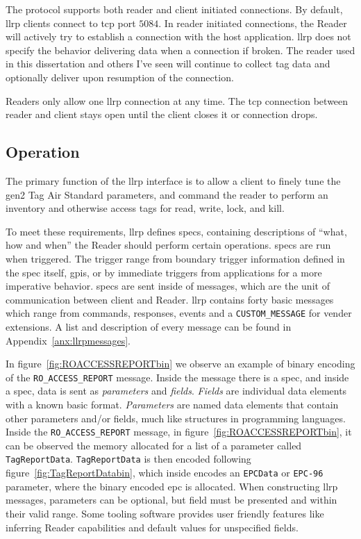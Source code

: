 The protocol supports both reader and client initiated connections. By default, \ac{llrp} clients connect to \acs{tcp} port $5084$. In reader initiated connections, the Reader will actively try to establish a connection with the host application.
\ac{llrp} does not specify the behavior delivering data when a connection if broken. The reader used in this dissertation and others I've seen will continue to collect tag data and optionally deliver upon resumption of the connection.

Readers only allow one \ac{llrp} connection at any time. The \ac{tcp} connection between reader and client stays open until the client closes it or connection drops.

\subsection{Operation}

The primary function of the \ac{llrp} interface is to allow a client to finely tune the \ac{gen2} Tag Air Standard parameters, and command the reader to perform an inventory and otherwise access tags for read, write, lock, and kill.

To meet these requirements, \ac{llrp} defines \acp{spec}, containing descriptions of ``what, how and when'' the Reader should perform certain operations.
\acp{spec} are run when triggered. The trigger range from boundary trigger information defined in the \ac{spec} itself, \acp{gpi}, or by immediate triggers from applications for a more imperative behavior.
\acp{spec} are sent inside of messages, which are the unit of communication between client and Reader.
\ac{llrp} contains forty basic messages which range from commands, responses, events and a \texttt{CUSTOM\_MESSAGE} for vender extensions. A list and description of every message can be found in Appendix~\ref{anx:llrpmessages}.

In figure~\ref{fig:ROACCESSREPORTbin} we observe an example of binary encoding of the \texttt{RO\_ACCESS\_REPORT} message.
Inside the message there is a \ac{spec}, and inside a \ac{spec}, data is sent as \emph{parameters} and \emph{fields}.
\emph{Fields} are individual data elements with a known basic format.
\emph{Parameters} are named data elements that contain other parameters and/or fields, much like structures in programming languages.
Inside the \texttt{RO\_ACCESS\_REPORT} message, in figure~\ref{fig:ROACCESSREPORTbin}, it can be observed the memory allocated for a list of a parameter called \texttt{TagReportData}. \texttt{TagReportData} is then encoded following figure~\ref{fig:TagReportDatabin}, which inside encodes an \texttt{EPCData} or \texttt{EPC-96} parameter, where the binary encoded \ac{epc} is allocated.
When constructing \ac{llrp} messages, parameters can be optional, but field must be presented and within their valid range. Some tooling software provides user friendly features like inferring Reader capabilities and default values for unspecified fields.

